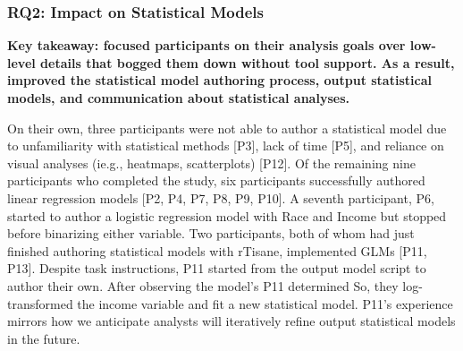 
\subsubsection{RQ2: \rTisanes Impact on Statistical Models}
\textbf{Key takeaway: 
\rTisane focused participants on their analysis goals over low-level details
that bogged them down without tool support. As a result, \rTisane improved the
statistical model authoring process, output statistical models, and
communication about statistical analyses.
}

On their own, three participants were not able to author a statistical model due
to unfamiliarity with statistical methods [P3], lack of time [P5], and reliance
on visual analyses (ie.g., heatmaps, scatterplots) [P12]. Of the remaining nine
participants who completed the study, six participants successfully authored
linear regression models [P2, P4, P7, P8, P9, P10]. A seventh participant, P6,
started to author a logistic regression model with Race and Income but stopped
before binarizing either variable. Two participants, both of whom had just
finished authoring statistical models with rTisane, implemented GLMs [P11, P13].
Despite task instructions, P11 started from the \rTisane output model script to
author their own.  After observing the model's  P11 determined  So, they log-transformed the income variable and fit a new statistical model. 
P11’s experience mirrors how we anticipate analysts will iteratively refine
\rTisane output statistical models in the future.

